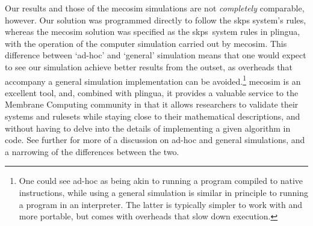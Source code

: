 Our results and those of the \gls{mecosim} simulations are not \emph{completely} comparable, however.  Our solution was programmed directly to follow the \gls{skps} system's rules, whereas the \gls{mecosim} solution was specified as the \gls{skps}~system rules in \gls{plingua}, with the operation of the computer simulation carried out by \gls{mecosim}.  This difference between `ad-hoc' and `general' simulation means that one would expect to see our simulation achieve better results from the outset, as overheads that accompany a general simulation implementation can be avoided.\footnote{One could see ad-hoc as being akin to running a program compiled to native instructions, while using a general simulation is similar in principle to running a program in an interpreter.  The latter is typically simpler to work with and more portable, but comes with overheads that slow down execution.}  \gls{mecosim} is an excellent tool, and, combined with \gls{plingua}, it provides a valuable service to the Membrane Computing community in that it allows researchers to validate their systems and rulesets while staying close to their mathematical descriptions, and without having to delve into the details of implementing a given algorithm in code.  See further \cite{Perez-Hurtado2018} for more of a discussion on ad-hoc and general simulations, and a narrowing of the differences between the two.